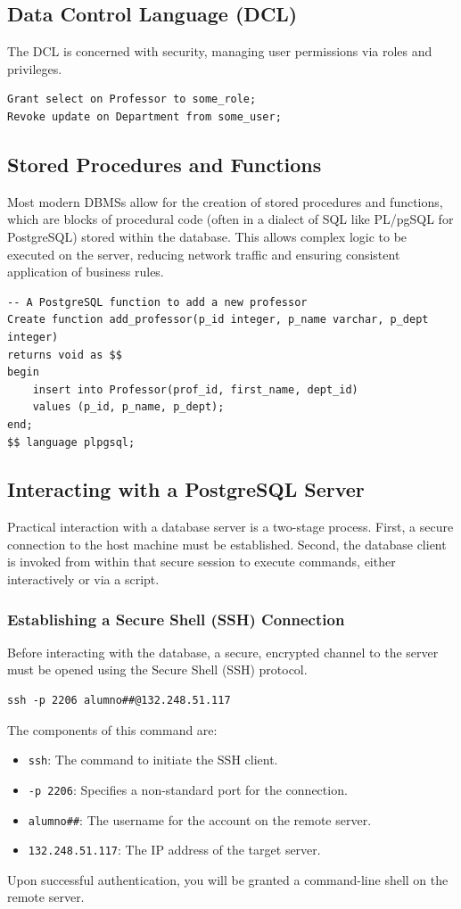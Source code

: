 \subsection{Data Control Language (DCL)}
The DCL is concerned with security, managing user permissions via roles and privileges.
\begin{verbatim}
Grant select on Professor to some_role;
Revoke update on Department from some_user;
\end{verbatim}

\subsection{Stored Procedures and Functions}
Most modern DBMSs allow for the creation of stored procedures and functions, which are blocks of procedural code (often in a dialect of SQL like PL/pgSQL for PostgreSQL) stored within the database. This allows complex logic to be executed on the server, reducing network traffic and ensuring consistent application of business rules.

\begin{verbatim}
-- A PostgreSQL function to add a new professor
Create function add_professor(p_id integer, p_name varchar, p_dept integer)
returns void as $$
begin
    insert into Professor(prof_id, first_name, dept_id)
    values (p_id, p_name, p_dept);
end;
$$ language plpgsql;
\end{verbatim}

\subsection{Interacting with a PostgreSQL Server}
Practical interaction with a database server is a two-stage process. First, a secure connection to the host machine must be established. Second, the database client is invoked from within that secure session to execute commands, either interactively or via a script.

\subsubsection{Establishing a Secure Shell (SSH) Connection}
Before interacting with the database, a secure, encrypted channel to the server must be opened using the Secure Shell (SSH) protocol.
\begin{verbatim}
ssh -p 2206 alumno##@132.248.51.117
\end{verbatim}
The components of this command are:
\begin{itemize}
    \item \texttt{ssh}: The command to initiate the SSH client.
    \item \texttt{-p 2206}: Specifies a non-standard port for the connection.
    \item \texttt{alumno\#\#}: The username for the account on the remote server.
    \item \texttt{132.248.51.117}: The IP address of the target server.
\end{itemize}
Upon successful authentication, you will be granted a command-line shell on the remote server.

